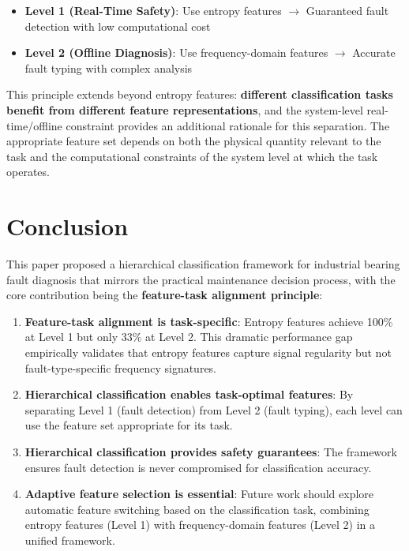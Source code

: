 \documentclass[11pt]{article}
\begin{document}
\begin{itemize}
    \item \textbf{Level 1 (Real-Time Safety)}: Use entropy features $\rightarrow$ Guaranteed fault detection with low computational cost
    \item \textbf{Level 2 (Offline Diagnosis)}: Use frequency-domain features $\rightarrow$ Accurate fault typing with complex analysis
\end{itemize}

This principle extends beyond entropy features: \textbf{different classification tasks benefit from different feature representations}, and the system-level real-time/offline constraint provides an additional rationale for this separation. The appropriate feature set depends on both the physical quantity relevant to the task and the computational constraints of the system level at which the task operates.

\section{Conclusion}

This paper proposed a hierarchical classification framework for industrial bearing fault diagnosis that mirrors the practical maintenance decision process, with the core contribution being the \textbf{feature-task alignment principle}:

\begin{enumerate}
    \item \textbf{Feature-task alignment is task-specific}: Entropy features achieve 100\% at Level 1 but only 33\% at Level 2. This dramatic performance gap empirically validates that entropy features capture signal regularity but not fault-type-specific frequency signatures.

    \item \textbf{Hierarchical classification enables task-optimal features}: By separating Level 1 (fault detection) from Level 2 (fault typing), each level can use the feature set appropriate for its task.

    \item \textbf{Hierarchical classification provides safety guarantees}: The framework ensures fault detection is never compromised for classification accuracy.

    \item \textbf{Adaptive feature selection is essential}: Future work should explore automatic feature switching based on the classification task, combining entropy features (Level 1) with frequency-domain features (Level 2) in a unified framework.
\end{enumerate}
\end{document}
